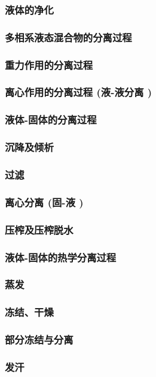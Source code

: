 \documentclass[UTF8]{../../ApplicationUniverse}
\begin{document}
        \subsubsection{液体的净化}
    \subsubsection{多相系液态混合物的分离过程}
        \subsubsection{重力作用的分离过程}
        \subsubsection{离心作用的分离过程 (液-液分离 )}
    \subsubsection{液体-固体的分离过程}
        \subsubsection{沉降及倾析}
        \subsubsection{过滤}
        \subsubsection{离心分离 (固-液 )}
        \subsubsection{压榨及压榨脱水}
    \subsubsection{液体-固体的热学分离过程}
        \subsubsection{蒸发}
        \subsubsection{冻结、干燥}
        \subsubsection{部分冻结与分离}
        \subsubsection{发汗}
\end{document}
